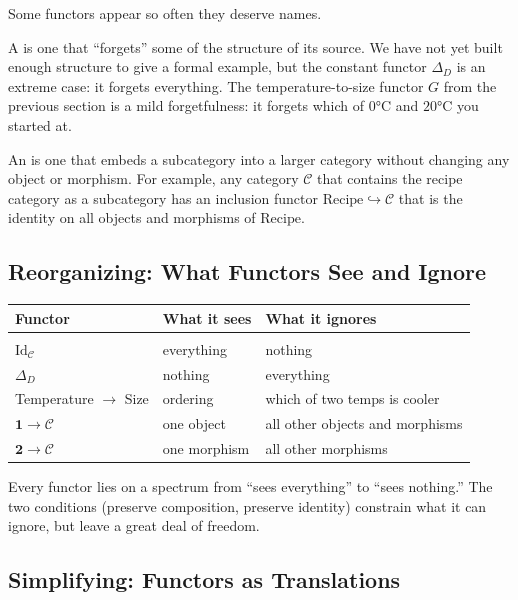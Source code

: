 Some functors appear so often they deserve names.

A  is one that ``forgets'' some of the structure of
its source. We have not yet built enough structure to give a formal example,
but the constant functor $\Delta_D$ is an extreme case: it forgets everything.
The temperature-to-size functor $G$ from the previous section is a mild
forgetfulness: it forgets which of $0°\text{C}$ and $20°\text{C}$ you started
at.

An  is one that embeds a subcategory into a larger
category without changing any object or morphism. For example, any category
$\mathcal{C}$ that contains the recipe category as a subcategory has an
inclusion functor $\mathrm{Recipe} \hookrightarrow \mathcal{C}$ that is the
identity on all objects and morphisms of $\mathrm{Recipe}$.

\subsection{Reorganizing: What Functors See and Ignore}

\begin{center}
\begin{tabular}{lll}
  Functor & What it sees & What it ignores \\[4pt]
  \hline\\[-6pt]
  $\mathrm{Id}_\mathcal{C}$ & everything & nothing \\
  $\Delta_D$ & nothing & everything \\
  Temperature $\to$ Size & ordering & which of two temps is cooler \\
  $\mathbf{1} \to \mathcal{C}$ & one object & all other objects and morphisms \\
  $\mathbf{2} \to \mathcal{C}$ & one morphism & all other morphisms \\
\end{tabular}
\end{center}

\medskip
Every functor lies on a spectrum from ``sees everything'' to ``sees nothing.''
The two conditions (preserve composition, preserve identity) constrain what it
can ignore, but leave a great deal of freedom.

\subsection{Simplifying: Functors as Translations}

